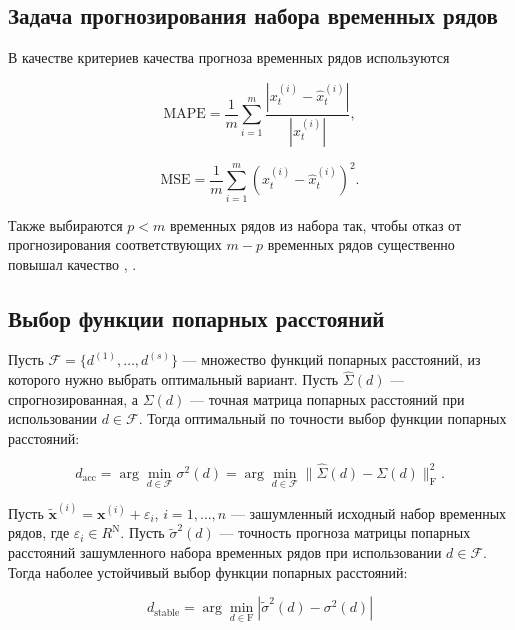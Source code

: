 \documentclass{article}
\begin{document}
\subsection{Задача прогнозирования набора временных рядов}

В качестве критериев качества прогноза временных рядов используются 

\begin{equation}
    \text{MAPE} = \frac{1}{m}\sum\limits_{i = 1}^{m}\dfrac{|x^{(i)}_t - \hat{x}^{(i)}_t|}{|x^{(i)}_t|},
\end{equation}

\begin{equation}
    \text{MSE} = \frac{1}{m}\sum\limits_{i = 1}^{m}(x^{(i)}_t - \hat{x}^{(i)}_t)^2.
\end{equation}

Также выбираются $p < m$ временных рядов из набора так, чтобы отказ от прогнозирования соответствующих $m - p$ временных рядов существенно повышал качество , . 

\subsection{Выбор функции попарных расстояний}

Пусть $\mathcal{F} = \{d^{(1)}, \ldots, d^{(s)}\}$ --- множество функций попарных расстояний, из которого нужно выбрать оптимальный вариант. Пусть $\hat{\Sigma}(d)$ --- спрогнозированная, а $\Sigma(d)$ --- точная матрица попарных расстояний при использовании $d \in \mathcal{F}$. Тогда оптимальный по точности выбор функции попарных расстояний:

\begin{equation}
    d_{\text{acc}} = \arg\min\limits_{d \in \mathcal{F}} \sigma^2(d) = \arg\min\limits_{d \in \mathcal{F}} \|\hat{\Sigma}(d) - \Sigma(d)\|_{\text{F}}^2.
\end{equation}

Пусть $\widetilde{\mathbf{x}}^{(i)} = \mathbf{x}^{(i)} + \varepsilon_i$, $i = 1, \ldots, n$ --- зашумленный исходный набор временных рядов, где $\varepsilon_i \in R^\text{N}$. Пусть $\widetilde{\sigma}^2(d)$ --- точность прогноза матрицы попарных расстояний зашумленного набора временных рядов при использовании $d \in \mathcal{F}$. Тогда наболее устойчивый выбор функции попарных расстояний:

\begin{equation}
    d_{\text{stable}} = \arg\min\limits_{d \in \text{F}}|\widetilde{\sigma}^2(d) - \sigma^2(d)|
\end{equation}
\end{document}
